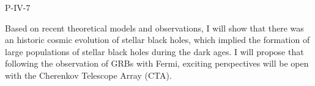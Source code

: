 P-IV-7


\bigskip



\bigskip

\noindent Based on recent theoretical models and observations, I will show that there was an historic cosmic evolution of stellar black holes, which implied the formation of large populations of stellar black holes during the dark ages. I will propose that following the observation of GRBs with Fermi, exciting perspectives will be open with the Cherenkov Telescope Array (CTA).

